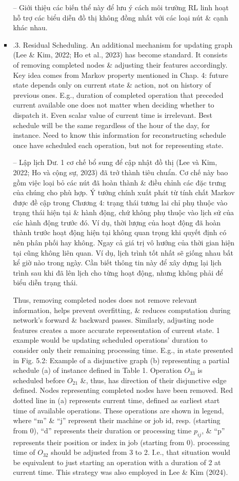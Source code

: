 \documentclass{article}
\begin{document}
\begin{itemize}
\begin{itemize}
\begin{itemize}
            -- Giới thiệu các biến thể này để lưu ý cách môi trường RL linh hoạt hỗ trợ các biểu diễn đồ thị không đồng nhất với các loại nút \& cạnh khác nhau.
            \item {.3. Residual Scheduling.} An additional mechanism for updating graph (Lee \& Kim, 2022; Ho et al., 2023) has become standard. It consists of removing completed nodes \& adjusting their features accordingly. Key idea comes from Markov property mentioned in Chap. 4: future state depends only on current state \& action, not on history of previous ones. E.g., duration of completed operation that preceded current available one does not matter when deciding whether to dispatch it. Even scalar value of current time is irrelevant. Best schedule will be the same regardless of the hour of the day, for instance. Need to know this information for reconstructing schedule once have scheduled each operation, but not for representing state.

            -- {\sf Lập lịch Dư.} 1 cơ chế bổ sung để cập nhật đồ thị (Lee và Kim, 2022; Ho và cộng sự, 2023) đã trở thành tiêu chuẩn. Cơ chế này bao gồm việc loại bỏ các nút đã hoàn thành \& điều chỉnh các đặc trưng của chúng cho phù hợp. Ý tưởng chính xuất phát từ tính chất Markov được đề cập trong Chương 4: trạng thái tương lai chỉ phụ thuộc vào trạng thái hiện tại \& hành động, chứ không phụ thuộc vào lịch sử của các hành động trước đó. Ví dụ, thời lượng của hoạt động đã hoàn thành trước hoạt động hiện tại không quan trọng khi quyết định có nên phân phối hay không. Ngay cả giá trị vô hướng của thời gian hiện tại cũng không liên quan. Ví dụ, lịch trình tốt nhất sẽ giống nhau bất kể giờ nào trong ngày. Cần biết thông tin này để xây dựng lại lịch trình sau khi đã lên lịch cho từng hoạt động, nhưng không phải để biểu diễn trạng thái.

            Thus, removing completed nodes does not remove relevant information, helps prevent overfitting, \& reduces computation during network's forward \& backward passes. Similarly, adjusting node features creates a more accurate representation of current state.  1 example would be updating scheduled operations' duration to consider only their remaining processing time. E.g., in state presented in {\sf Fig. 5.2: Example of a disjunctive graph (b) representing a partial schedule (a) of instance defined in Table 1. Operation $O_{33}$ is scheduled before $O_{21}$ \&, thus, has direction of their disjunctive edge defined. Nodes representing completed nodes have been removed. Red dotted line in (a) represents current time, defined as earliest start time of available operations. These operations are shown in legend, where ``m'' \& ``j'' represent their machine or job id, resp. (starting from 0), ``d'' represents their duration or processing time $p_{ij}$, \& ``p'' represents  their position or index in job (starting from 0).} processing time of $O_{32}$ should be adjusted from 3 to 2. I.e., that situation would be equivalent to just starting an operation with a duration of 2 at current time. This strategy was also employed in Lee \& Kim (2024).


\end{itemize}
\end{itemize}
\end{itemize}
\end{document}

